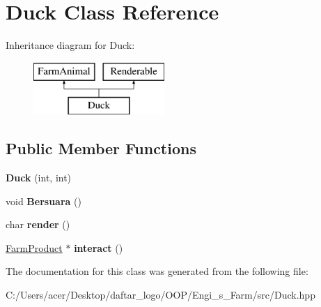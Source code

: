 \hypertarget{class_duck}{}\section{Duck Class Reference}
\label{class_duck}
Inheritance diagram for Duck\+:\begin{figure}[H]
\begin{center}
\leavevmode
\includegraphics[height=2.000000cm]{class_duck}
\end{center}
\end{figure}
\subsection*{Public Member Functions}
\begin{DoxyCompactItemize}
\item 
\mbox{\label{class_duck_aa1c665ec2304c62e280abc629a5f694d}} 
{\bfseries Duck} (int, int)
\item 
\mbox{\label{class_duck_a06cb386d59bbc06f1a565f0503025e2c}} 
void {\bfseries Bersuara} ()
\item 
\mbox{\label{class_duck_aab09de20800285320ab614bafcab392d}} 
char {\bfseries render} ()
\item 
\mbox{\label{class_duck_a317125600fc3f154c8775a2a0cd35124}} 
\mbox{\hyperlink{class_farm_product}{Farm\+Product}} $\ast$ {\bfseries interact} ()
\end{DoxyCompactItemize}


The documentation for this class was generated from the following file\+:\begin{DoxyCompactItemize}
\item 
C\+:/\+Users/acer/\+Desktop/daftar\+\_\+logo/\+O\+O\+P/\+Engi\+\_\+s\+\_\+\+Farm/src/Duck.\+hpp\end{DoxyCompactItemize}
